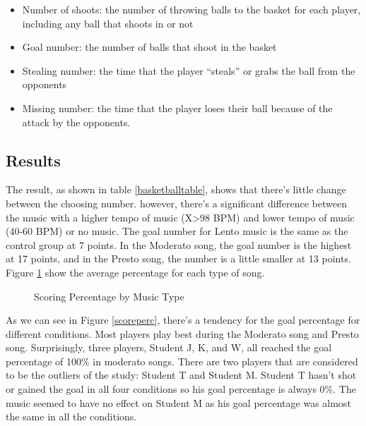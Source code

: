 \documentclass[man,floatsintext]{apa7}
\begin{document}
\begin{itemize}
\item Number of shoots: the number of throwing balls to the basket for each player, including any ball that shoots in or not
\item Goal number: the number of balls that shoot in the basket
\item Stealing number: the time that the player ``steals'' or grabs the ball from the opponents
\item Missing number: the time that the player loses their ball because of the attack by the opponents.
\end{itemize}

\subsection{Results}

The result, as shown in table \ref{basketballtable}, shows that there's little change between the choosing number. however, there's a significant difference between the music with a higher tempo of music (X>98 BPM) and lower tempo of music (40-60 BPM) or no music. The goal number for Lento music is the same as the control group at 7 points. In the Moderato song, the goal number is the highest at 17 points, and in the Presto song, the number is a little smaller at 13 points. Figure \ref{scoring_percentage} show the average percentage for each type of song.

\begin{figure}[h]
\centering
\caption{Scoring Percentage by Music Type}
\label{scoring_percentage}
\end{figure}


As we can see in Figure \ref{scoreperc}, there's a tendency for the goal percentage for different conditions. Most players play best during the Moderato song and Presto song. Surprisingly, three players, Student J, K, and W, all reached the goal percentage of 100\% in moderato songs. There are two players that are considered to be the outliers of the study: Student T and Student M. Student T hasn't shot or gained the goal in all four conditions so his goal percentage is always 0\%. The music seemed to have no effect on Student M as his goal percentage was almost the same in all the conditions.
\end{document}
